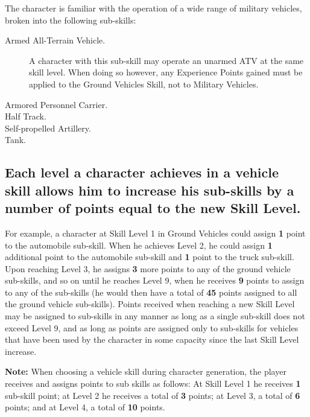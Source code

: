 \label{sec:skill-military-vehicles}

The character is familiar with the operation of a wide range of
military vehicles, broken into the following sub-skills:

\begin{description}
\item[Armed All-Terrain Vehicle.]  A character with this sub-skill may
  operate an unarmed ATV at the same skill level.  When doing so
  however, any Experience Points gained must be applied to the Ground
  Vehicles Skill, not to Military Vehicles.
\item[Armored Personnel Carrier.] 
\item[Half Track.] 
\item[Self-propelled Artillery.] 
\item[Tank.]
\end{description}

\subsection[Sub-Skill Levels]{Each level a character achieves in a
  vehicle skill allows him to increase his sub-skills by a number of
  points equal to the new Skill Level.}
\label{sec:vehsubskills}

For example, a character at Skill Level 1 in Ground Vehicles could
assign \textbf{1} point to the automobile sub-skill.  When he achieves
Level 2, he could assign \textbf{1} additional point to the automobile
sub-skill and \textbf{1} point to the truck sub-skill.  Upon reaching
Level 3, he assigns \textbf{3} more points to any of the ground
vehicle sub-skills, and so on until he reaches Level 9, when he
receives \textbf{9} points to assign to any of the sub-skills (he
would then have a total of \textbf{45} points assigned to all the
ground vehicle sub-skills).  Points received when reaching a new Skill
Level may be assigned to sub-skills in any manner as long as a single
sub-skill does not exceed Level 9, and as long as points are assigned
only to sub-skills for vehicles that have been used by the character
in some capacity since the last Skill Level increase.

\textbf{Note:} When choosing a vehicle skill during character
generation, the player receives and assigns points to sub skills as
follows: At Skill Level 1 he receives \textbf{1} sub-skill point; at
Level 2 he receives a total of \textbf{3} points; at Level 3, a total
of \textbf{6} points; and at Level 4, a total of \textbf{10} points.

